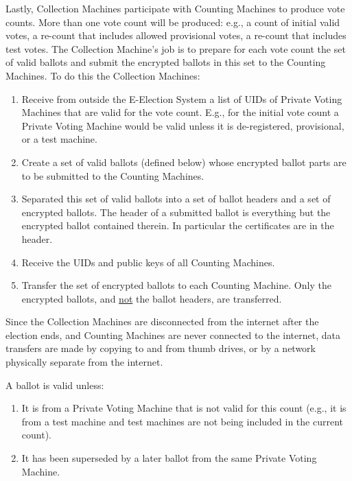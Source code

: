 \documentclass[12pt]{article}
\begin{document}
Lastly, Collection Machines participate with Counting Machines to
produce vote counts.  More than one vote count will be produced:
e.g., a count of initial valid votes, a re-count that includes
allowed provisional votes, a re-count that includes test votes.
The Collection Machine's job is to prepare for each vote count
the set of valid ballots and submit the encrypted ballots in
this set to the Counting Machines.
To do this the Collection Machines:

\begin{enumerate}
\setcounter{enumi}{\value{CMC-COUNTER}}
\item Receive from outside the E-Election System a list of UIDs of
Private Voting Machines that are valid for the vote count.
E.g., for the initial vote count a Private Voting Machine would
be valid unless it is de-registered, provisional, or a test machine.
\item Create a set of valid ballots (defined below)
whose encrypted ballot parts are to be submitted to the Counting Machines.
\item Separated this set of valid ballots into a set of ballot headers
and a set of encrypted ballots.  The header of a submitted ballot is
everything but the encrypted ballot contained therein.  In particular
the certificates are in the header.
\item Receive the UIDs and public keys of all Counting Machines.
\item Transfer the set of encrypted ballots to each Counting Machine.
Only the encrypted ballots, and \underline{not} the ballot headers,
are transferred.
\end{enumerate}

Since the Collection Machines are disconnected from the internet
after the election ends, and Counting Machines
are never connected to the internet,
data transfers are made by copying to and from thumb drives, or by
a network physically separate from the internet.

A ballot is valid unless:

\begin{enumerate}
\item It is from a Private Voting Machine that is not valid for
this count (e.g., it is from a test machine and test machines
are not being included in the current count).
\item It has been superseded by a later ballot from the same
Private Voting Machine.
\end{enumerate}
\end{document}
